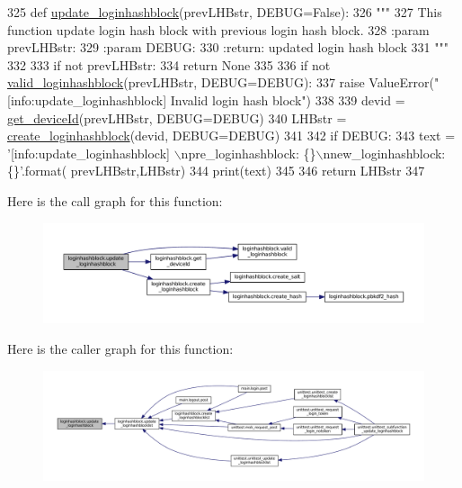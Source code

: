 \begin{DoxyCode}
325 \textcolor{keyword}{def }\hyperlink{namespaceloginhashblock_afef75d97c834ce0fda711b93d0b56b00}{update\_loginhashblock}(prevLHBstr, DEBUG=False):
326     \textcolor{stringliteral}{"""}
327 \textcolor{stringliteral}{    This function update login hash block with previous login hash block.}
328 \textcolor{stringliteral}{    :param prevLHBstr:}
329 \textcolor{stringliteral}{    :param DEBUG:}
330 \textcolor{stringliteral}{    :return: updated login hash block}
331 \textcolor{stringliteral}{    """}
332 
333     \textcolor{keywordflow}{if} \textcolor{keywordflow}{not} prevLHBstr:
334         \textcolor{keywordflow}{return} \textcolor{keywordtype}{None}
335 
336     \textcolor{keywordflow}{if} \textcolor{keywordflow}{not} \hyperlink{namespaceloginhashblock_adb424539d851426da7b65d53c5a6d577}{valid\_loginhashblock}(prevLHBstr, DEBUG=DEBUG):
337         \textcolor{keywordflow}{raise} ValueError(\textcolor{stringliteral}{"[info:update\_loginhashblock] Invalid login hash block"})
338 
339     devid = \hyperlink{namespaceloginhashblock_a17417f2f6bca76ab51170082a562e5f6}{get\_deviceId}(prevLHBstr, DEBUG=DEBUG)
340     LHBstr = \hyperlink{namespaceloginhashblock_ad3ef8dab740c69ca8424797f9c146a53}{create\_loginhashblock}(devid, DEBUG=DEBUG)
341 
342     \textcolor{keywordflow}{if} DEBUG:
343         text = \textcolor{stringliteral}{'[info:update\_loginhashblock] \(\backslash\)npre\_loginhashblock: \{\}\(\backslash\)nnew\_loginhashblock: \{\}'}.format(
      prevLHBstr,LHBstr)
344         print(text)
345 
346     \textcolor{keywordflow}{return} LHBstr
347 
\end{DoxyCode}


Here is the call graph for this function\+:\nopagebreak
\begin{figure}[H]
\begin{center}
\leavevmode
\includegraphics[width=350pt]{namespaceloginhashblock_afef75d97c834ce0fda711b93d0b56b00_cgraph}
\end{center}
\end{figure}




Here is the caller graph for this function\+:\nopagebreak
\begin{figure}[H]
\begin{center}
\leavevmode
\includegraphics[width=350pt]{namespaceloginhashblock_afef75d97c834ce0fda711b93d0b56b00_icgraph}
\end{center}
\end{figure}


